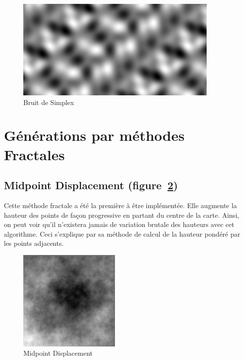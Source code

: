 \begin{figure}[!ht]
    \begin{center}
	\includegraphics[width=10cm]{resources/simplexnoise.png}
        \caption{Bruit de Simplex}
        \label{fig:simplexnoise}
    \end{center}
\end{figure}

\section{Générations par méthodes Fractales}

\subsection{Midpoint Displacement (figure~\ref{fig:midpoint-displacementRef})}
Cette méthode fractale a été la première à être implémentée. Elle augmente la hauteur des points de 
façon progressive en partant du centre de la carte. Ainsi, on peut voir qu'il n'existera jamais de 
variation brutale des hauteurs avec cet algorithme. Ceci s'explique par sa méthode de calcul de la hauteur 
pondéré par les points adjacents.

\begin{figure}[!ht]
    \begin{center}
	\includegraphics[width=5cm]{resources/midpoint_ref.png}
        \caption{Midpoint Displacement}
        \label{fig:midpoint-displacementRef}
    \end{center}
\end{figure}

